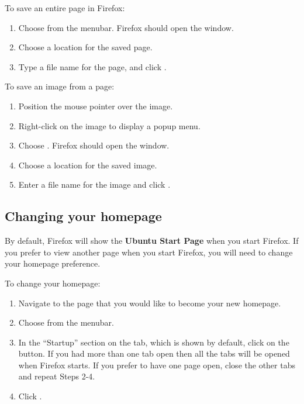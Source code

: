 To save an entire page in Firefox:

\begin{enumerate}
  \item Choose  from the menubar. Firefox should
open the  window.
  \item Choose a location for the saved page.
  \item Type a file name for the page, and click .
\end{enumerate}

\noindent To save an image from a page:

\begin{enumerate}
  \item Position the mouse pointer over the image.
  \item Right-click on the image to display a popup menu.
  \item Choose . Firefox should open the 
 window.
  \item Choose a location for the saved image.
  \item Enter a file name for the image and click .
\end{enumerate}

\subsection{Changing your homepage}

By default, Firefox will show the \textbf{Ubuntu Start Page} when you start
Firefox. If you prefer to view another page when you start Firefox, you 
will need to change your homepage preference.



\noindent To change your homepage:

\begin{enumerate}
  \item Navigate to the page that you would like to become your new homepage.
  \item Choose  from the menubar.
  \item In the ``Startup'' section on the  tab, which is shown by
default, click on the  button. If you had more than 
one tab open then all the tabs will be opened when Firefox starts. If you prefer to have one page open, close the other tabs and repeat Steps 2-4.
  \item Click .
\end{enumerate}


